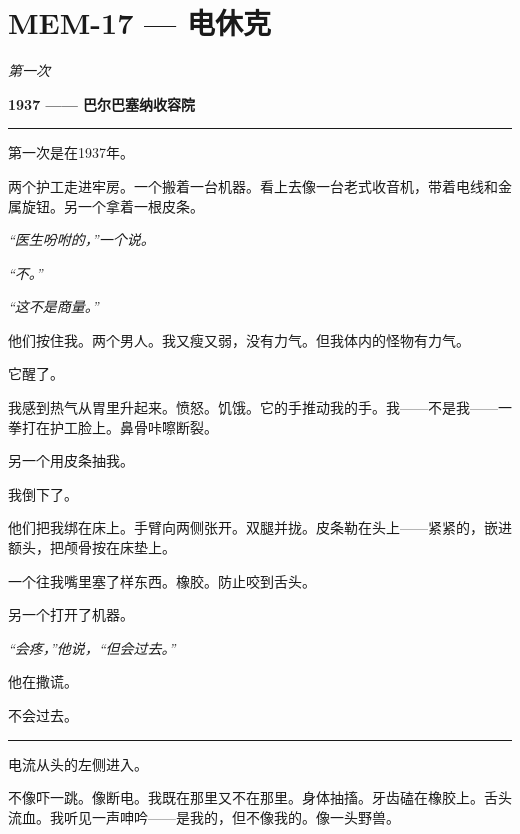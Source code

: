 \section*{\textbf{MEM-17} --- 电休克}

\noindent \textit{第一次}

\noindent \textbf{1937 —— 巴尔巴塞纳收容院}

\vspace{0.5em}\noindent\rule{\textwidth}{0.5pt}\vspace{0.5em}

\noindent 第一次是在1937年。

\noindent 两个护工走进牢房。一个搬着一台机器。看上去像一台老式收音机，带着电线和金属旋钮。另一个拿着一根皮条。

\noindent \textit{“医生吩咐的，”一个说。}

\noindent \textit{“不。”}

\noindent \textit{“这不是商量。”}

\noindent 他们按住我。两个男人。我又瘦又弱，没有力气。但我体内的怪物有力气。

\noindent 它醒了。

\noindent 我感到热气从胃里升起来。愤怒。饥饿。它的手推动我的手。我——不是我——一拳打在护工脸上。鼻骨咔嚓断裂。

\noindent 另一个用皮条抽我。

\noindent 我倒下了。

\noindent 他们把我绑在床上。手臂向两侧张开。双腿并拢。皮条勒在头上——紧紧的，嵌进额头，把颅骨按在床垫上。

\noindent 一个往我嘴里塞了样东西。橡胶。防止咬到舌头。

\noindent 另一个打开了机器。

\noindent \textit{“会疼，”他说，“但会过去。”}

\noindent 他在撒谎。

\noindent 不会过去。

\vspace{0.5em}\noindent\rule{\textwidth}{0.5pt}\vspace{0.5em}

\noindent 电流从头的左侧进入。

\noindent 不像吓一跳。像断电。我既在那里又不在那里。身体抽搐。牙齿磕在橡胶上。舌头流血。我听见一声呻吟——是我的，但不像我的。像一头野兽。

